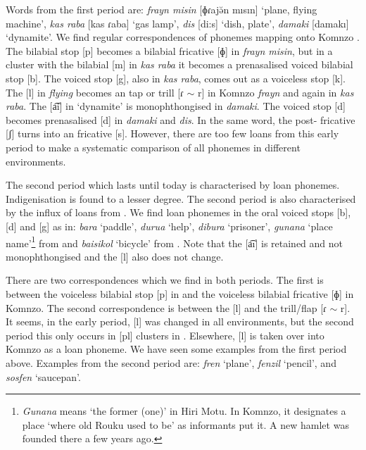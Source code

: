 Words from the first period are: \emph{frayn misin} [ɸɾajə̆n mısın] `plane, flying machine', \emph{kas raba} [kas ɾaba] `gas lamp', \emph{dis} [di:s] `dish, plate', \emph{damaki} [damakı] `dynamite'. We find regular correspondences of  phonemes mapping onto Komnzo . The bilabial stop [p] becomes a bilabial fricative [ɸ] in \emph{frayn misin}, but in a cluster with the bilabial  [m] in \emph{kas raba} it becomes a prenasalised voiced bilabial stop [b]. The  voiced stop [g], also in \emph{kas raba}, comes out as a voiceless  stop [k]. The   [l] in  \emph{flying} becomes an  tap or trill [ɾ $\sim$ r] in Komnzo \emph{frayn} and again in \emph{kas raba}. The   [a͡i] in `dynamite' is monophthongised in \emph{damaki}. The voiced  stop [d] becomes prenasalised [d] in \emph{damaki} and \emph{dis}. In the same word, the post- fricative [ʃ] turns into an  fricative [s]. However, there are too few loans from this early period to make a systematic comparison of all  phonemes in different environments.%

The second period which lasts until today is characterised by loan phonemes. Indigenisation is found to a lesser degree. The second period is also characterised by the influx of loans from . We find loan phonemes in the oral voiced stops [b], [d] and [g] as in: \emph{bara} `paddle', \emph{durua} `help', \emph{dibura} `prisoner', \emph{gunana} `place name'\footnote{\emph{Gunana} means `the former (one)' in Hiri Motu. In Komnzo, it designates a place `where old Rouku used to be' as informants put it. A new hamlet was founded there a few years ago.} from  and \emph{baisikol} `bicycle' from . Note that the   [a͡ı] is retained and not monophthongised and the   [l] also does not change.%

There are two correspondences which we find in both periods. The first is between the voiceless bilabial stop [p] in  and the voiceless bilabial fricative [ɸ] in Komnzo. The second correspondence is between the   [l] and the  trill/flap [ɾ $\sim$ r]. It seems, in the early period, [l] was changed in all environments, but the second period this only occurs in [pl] clusters in . Elsewhere, [l] is taken over into Komnzo as a loan phoneme. We have seen some examples from the first period above. Examples from the second period are: \emph{fren} `plane', \emph{fenzil} `pencil', and \emph{sosfen} `saucepan'.

